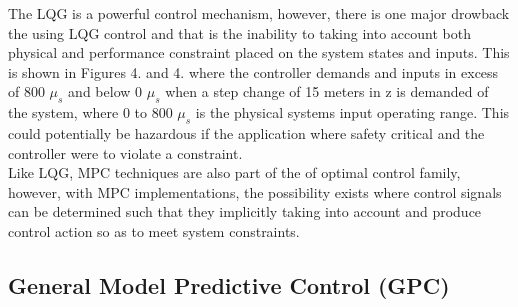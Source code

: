 \documentclass[12pt,a4paper,twoside]{report}
\begin{document}
				The LQG is a powerful control mechanism, however, there is one major drowback the using LQG control and that is the inability to taking into account both physical and performance constraint placed on the system states and inputs. This is shown in Figures 4. and 4. where the controller demands and inputs in excess of 800 $\mu_s$ and below 0 $\mu_s$ when a  step change of 15 meters in z is demanded of the system, where 0 to 800 $\mu_s$ is the physical systems input operating range. This could potentially be hazardous if the application where safety critical and the controller were to violate a constraint.
				\\
				Like LQG, MPC techniques are also part of the of optimal control family, however, with MPC implementations, the possibility exists where control signals can be determined such that they implicitly taking into account and produce control action so as to meet system constraints. 
				
			\subsection{General Model Predictive Control (GPC)}
			
\end{document}
